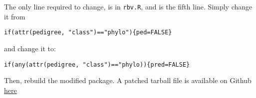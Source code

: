 \documentclass[
]{article}
\begin{document}
The only line required to change, is in \texttt{rbv.R}, and is the fifth
line. Simply change it from

\begin{verbatim}
if(attr(pedigree, "class")=="phylo"){ped=FALSE}
\end{verbatim}

and change it to:

\begin{verbatim}
if(any(attr(pedigree, "class")=="phylo)){pred=FALSE}
\end{verbatim}

Then, rebuild the modified package. A patched tarball file is available
on Github
\href{https://github.com/frederni/TMA4900-MasterThesis/blob/main/MCMCglmm-rbv-patch.tar.gz}{here}
\end{document}
